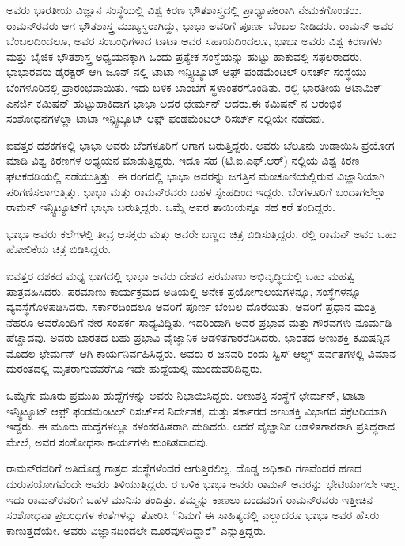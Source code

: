 ಅವರು ಭಾರತೀಯ ವಿಜ್ಞಾನ ಸಂಸ್ಥೆಯಲ್ಲಿ ವಿಶ್ವ ಕಿರಣ ಭೌತಶಾಸ್ತ್ರದಲ್ಲಿ ಪ್ರಾಧ್ಯಾಪಕರಾಗಿ ನೇಮಕಗೊಂಡರು. ರಾಮನ್‍ರವರು ಆಗ ಭೌತಶಾಸ್ತ್ರ ಮುಖ್ಯಸ್ಥರಾಗಿದ್ದು, ಭಾಭಾ ಅವರಿಗೆ ಪೂರ್ಣ ಬೆಂಬಲ ನೀಡಿದರು. ರಾಮನ್ ಅವರ ಬೆಂಬಲದಿಂದಲೂ, ಅವರ ಸಂಬಂಧಿಗಳಾದ ಟಾಟಾ ಅವರ ಸಹಾಯದಿಂದಲೂ, ಭಾಭಾ ಅವರು ವಿಶ್ವ ಕಿರಣಗಳು ಮತ್ತು ಬೈಜಿಕ ಭೌತಶಾಸ್ತ್ರ ಅಧ್ಯಯನಕ್ಕಾಗಿ ಒಂದು ಪ್ರತ್ಯೇಕ ಸಂಸ್ಥೆಯನ್ನು ಹುಟ್ಟು ಹಾಕುವಲ್ಲಿ ಸಫಲರಾದರು. ಭಾಭಾರವರು ಡೈರಕ್ಟರ್ ಆಗಿ  ಜೂನ್ ನಲ್ಲಿ ಟಾಟಾ ಇನ್ಸ್ಟಿಟ್ಯೂಟ್ ಆಫ಼್ ಫಂಡಮೆಂಟಲ್ ರಿಸರ್ಚ್ ಸಂಸ್ಥೆಯು ಬೆಂಗಳೂರಿನಲ್ಲಿ ಪ್ರಾರಂಭವಾಯಿತು. ಇದು ಬಳಿಕ ಬಾಂಬೆಗೆ ಸ್ಥಳಾಂತರಗೊಂಡಿತು. ರಲ್ಲಿ ಭಾರತೀಯ ಅಟಾಮಿಕ್ ಎನರ್ಜಿ ಕಮಿಷನ್ ಹುಟ್ಟುಹಾಕಿದಾಗ ಭಾಭಾ ಅದರ ಛೇರ್ಮನ್ ಆದರು.\break ಈ ಕಮಿಷನ್ ನ ಆರಂಭಿಕ ಸಂಶೋಧನೆಗಳೆಲ್ಲಾ ಟಾಟಾ ಇನ್ಸ್ಟಿಟ್ಯೂಟ್ ಆಫ಼್ ಫಂಡಮೆಂಟಲ್ ರಿಸರ್ಚ್ ನಲ್ಲಿಯೇ ನಡೆದವು.

ಐವತ್ತರ ದಶಕಗಳಲ್ಲಿ ಭಾಭಾ ಅವರು ಬೆಂಗಳೂರಿಗೆ ಆಗಾಗ ಬರುತ್ತಿದ್ದರು. ಅವರು ಬೆಲೂನು ಉಡಾಯಿಸಿ ಪ್ರಯೋಗ ಮಾಡಿ ವಿಶ್ವ ಕಿರಣಗಳ ಅಧ್ಯಯನ ಮಾಡುತ್ತಿದ್ದರು. ಇದೂ ಸಹ (ಟಿ.ಐ.ಎಫ್.ಆರ್) ನಲ್ಲಿಯ ವಿಶ್ವ ಕಿರಣ ಘಟಕದಡಿಯಲ್ಲಿ ನಡೆಯುತ್ತಿತ್ತು. ಈ ರಂಗದಲ್ಲಿ ಭಾಭಾ ಅವರನ್ನು ಜಗತ್ತಿನ ಮಂಚೂಣಿಯಲ್ಲಿರುವ ವಿಜ್ಞಾನಿಯಾಗಿ ಪರಿಗಣಿಸಲಾಗುತ್ತಿತ್ತು. ಭಾಭಾ ಮತ್ತು ರಾಮನ್‍ರವರು ಬಹಳ ಸ್ನೇಹದಿಂದ ಇದ್ದರು. ಬೆಂಗಳೂರಿಗೆ ಬಂದಾಗಲೆಲ್ಲಾ ರಾಮನ್ ಇನ್ಸ್ಟಿಟ್ಯೂಟ್‍ಗೆ ಭಾಭಾ ಬರುತ್ತಿದ್ದರು. ಒಮ್ಮೆ ಅವರ ತಾಯಿಯನ್ನೂ ಸಹ ಕರೆ ತಂದಿದ್ದರು.

ಭಾಭಾ ಅವರು ಕಲೆಗಳಲ್ಲಿ ತೀವ್ರ ಆಸಕ್ತರು ಮತ್ತು ಅವರೇ ಬಣ್ಣದ ಚಿತ್ರ ಬಿಡಿಸುತ್ತಿದ್ದರು. ರಲ್ಲಿ ರಾಮನ್ ಅವರ ಬಹು ಹೋಲಿಕೆಯ ಚಿತ್ರ ಬಿಡಿಸಿದ್ದರು.

ಐವತ್ತರ ದಶಕದ ಮಧ್ಯ ಭಾಗದಲ್ಲಿ ಭಾಭಾ ಅವರು ದೇಶದ ಪರಮಾಣು ಅಭಿವೃದ್ಧಿಯಲ್ಲಿ ಬಹು ಮಹತ್ವ ಪಾತ್ರವಹಿಸಿದರು. ಪರಮಾಣು ಕಾರ್ಯಕ್ರಮದ ಅಡಿಯಲ್ಲಿ ಅನೇಕ ಪ್ರಯೋಗಾಲಯ\-ಗಳನ್ನೂ, ಸಂಸ್ಥೆಗಳನ್ನೂ ವ್ಯವಸ್ಥೆಗೊಳಪಡಿಸಿದರು. ಸರ್ಕಾರದಿಂದಲೂ ಅವರಿಗೆ ಪೂರ್ಣ ಬೆಂಬಲ ದೊರೆಯಿತು. ಅವರಿಗೆ ಪ್ರಧಾನ ಮಂತ್ರಿ ನೆಹರೂ ಅವರೊಂದಿಗೆ ನೇರ ಸಂಪರ್ಕ ಸಾಧ್ಯವಿದ್ದಿತು. ಇದರಿಂದಾಗಿ ಅವರ ಪ್ರಭಾವ ಮತ್ತು ಗೌರವಗಳು ನೂರ್ಮಡಿ ಹೆಚ್ಚಾದವು. ಅವರು ಭಾರತದ ಬಹು ಪ್ರಭಾವಿ ವೈಜ್ಞಾನಿಕ ಆಡಳಿತಗಾರರೆನಿಸಿದರು. ಭಾರತದ ಅಣುಶಕ್ತಿ ಕಮಿಷನ್ನಿನ ಮೊದಲ ಛೇರ್ಮನ್ ಆಗಿ ಕಾರ್ಯನಿರ್ವಹಿಸಿದ್ದರು. ಅವರು ರ ಜನವರಿ ರಂದು ಸ್ವಿಸ್ ಆಲ್ಪ್ಸ್ ಪರ್ವತಗಳಲ್ಲಿ ವಿಮಾನ ದುರಂತದಲ್ಲಿ ಮೃತರಾಗುವವರೆಗೂ ಇದೇ ಹುದ್ದೆಯಲ್ಲಿ ಮುಂದುವರಿದಿದ್ದರು.

ಒಮ್ಮೆಗೇ ಮೂರು ಪ್ರಮುಖ ಹುದ್ದೆಗಳನ್ನು ಅವರು ನಿಭಾಯಿಸಿದ್ದರು. ಅಣುಶಕ್ತಿ ಸಂಸ್ಥೆಗೆ ಛೇರ್ಮನ್, ಟಾಟಾ ಇನ್ಸ್ಟಿಟ್ಯೂಟ್ ಆಫ಼್ ಫಂಡಮೆಂಟಲ್ ರಿಸರ್ಚ್‌ನ ನಿರ್ದೇಶಕ, ಮತ್ತು ಸರ್ಕಾರದ ಅಣುಶಕ್ತಿ ವಿಭಾಗದ ಸೆಕ್ರೆಟರಿಯಾಗಿ ಇದ್ದರು. ಈ ಮೂರು ಹುದ್ದೆಗಳಲ್ಲೂ ಕಳಂಕರಹಿತರಾಗಿ ದುಡಿದರು. ಆದರೆ ವೈಜ್ಞಾನಿಕ ಆಡಳಿತಗಾರರಾಗಿ ಪ್ರಸಿದ್ಧರಾದ ಮೇಲೆ, ಅವರ ಸಂಶೋಧನಾ ಕಾರ್ಯಗಳು ಕುಂಠಿತವಾದವು.

ರಾಮನ್‍ರವರಿಗೆ ಅತಿದೊಡ್ಡ ಗಾತ್ರದ ಸಂಸ್ಥೆಗಳೆಂದರೆ ಆಗುತ್ತಿರಲಿಲ್ಲ. ದೊಡ್ಡ ಅಧಿಕಾರಿ ಗಣವೆಂದರೆ ಹಣದ ದುರುಪಯೋಗವೆಂದೇ ಅವರು ತಿಳಿಯುತ್ತಿದ್ದರು. ರ ಬಳಿಕ ಭಾಭಾ ಅವರು ರಾಮನ್ ಅವರನ್ನು ಭೇಟಿಯಾಗಲೇ ಇಲ್ಲ. ಇದು ರಾಮನ್‍ರವರಿಗೆ ಬಹಳ ಮುನಿಸು ತಂದಿತ್ತು. ತಮ್ಮನ್ನು ಕಾಣಲು ಬಂದವರಿಗೆ ರಾಮನ್‍ರವರು ಇತ್ತೀಚಿನ ಸಂಶೋಧನಾ ಪ್ರಬಂಧಗಳ ಕಂತೆಗಳನ್ನು ತೋರಿಸಿ “ನಿಮಗೆ ಈ ಸಾಹಿತ್ಯದಲ್ಲಿ ಎಲ್ಲಾದರೂ ಭಾಭಾ ಅವರ ಹೆಸರು ಕಾಣುತ್ತದೆಯೇ. ಅವರು ವಿಜ್ಞಾನದಿಂದಲೇ ದೂರವುಳಿದಿದ್ದಾರೆ” ಎನ್ನುತ್ತಿದ್ದರು.


